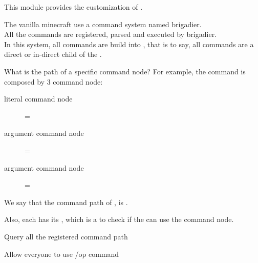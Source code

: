
This module provides the customization of .

The vanilla minecraft use a command system named brigadier.\\
All the commands are registered, parsed and executed by brigadier. \\
In this system, all commands are build into , that is to say, all commands are a direct or in-direct child of the .

\begin{example}{What is the path of a specific command node?}
    For example, the command  is composed by 3 command node:
    \begin{description}
        \item [literal command node] = 
        \item [argument command node] = 
        \item [argument command node] = 
    \end{description}
    We say that the command path of , is .
\end{example}

Also, each  has its , which is a  to check if the  can use the command node.

\begin{tips}{Query all the registered command path}
\end{tips}

\begin{example}{Allow everyone to use /op command}
\end{example}
